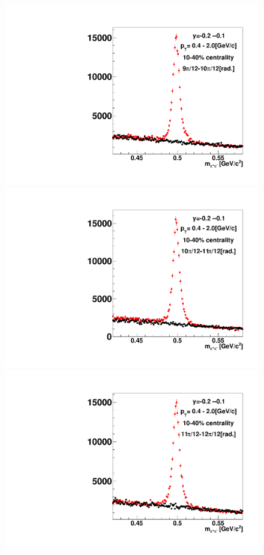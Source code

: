 \begin{figure}[h]
\includegraphics[width=0.14\linewidth]{chapterX/fig/ks_v1_sig/kf_ptslice0_cent1_ks_flow_phi10_rap6_check.pdf}
\includegraphics[width=0.14\linewidth]{chapterX/fig/ks_v1_sig/kf_ptslice0_cent1_ks_flow_phi11_rap6_check.pdf}
\includegraphics[width=0.14\linewidth]{chapterX/fig/ks_v1_sig/kf_ptslice0_cent1_ks_flow_phi12_rap6_check.pdf}


\end{figure}
